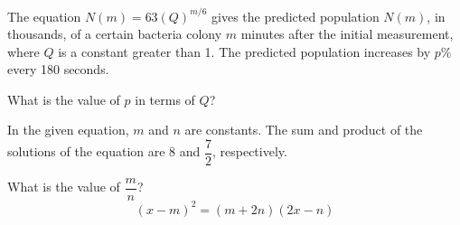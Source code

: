 \vspace{0.75em}


\vspace{2em}
\newpage
\noindent\markforreview
\vspace{1em}

The equation \(N(m) = 63(Q)^{m/6}\) gives the predicted population \(N(m)\), in thousands, of a certain bacteria colony \(m\) minutes after the initial measurement, where \(Q\) is a constant greater than 1. The predicted population increases by \(p\%\) every 180 seconds.

What is the value of \(p\) in terms of \(Q\)?

\vspace{0.75em}


\vspace{2em}

\noindent\markforreview
\vspace{1em}

In the given equation, \(m\) and \(n\) are constants. The sum and product of the solutions of the equation are 8 and \(\dfrac{7}{2}\), respectively.

What is the value of \(\dfrac{m}{n}\)?
\[
(x - m)^2 = (m + 2n)(2x - n)
\]

\vspace{0.75em}

